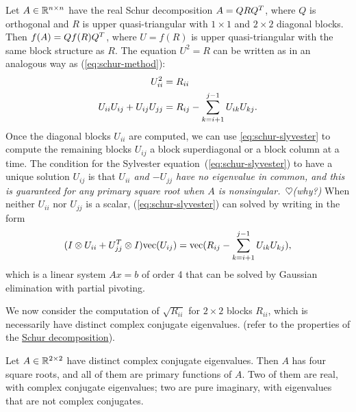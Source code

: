 \documentclass{article}
\newcommand{\textus}[1]{\textup{\textsf{#1}}}
\renewcommand{\comment}[1]{\textus{\color{violet}\ $\heartsuit$(#1)}}
\begin{document}
Let $A \in \mathbb{R}^{n\times n}$ have the real Schur decomposition $A = QRQ^{T}$, where $Q$
is orthogonal and $R$ is upper quasi-triangular with $1\times 1$ and
$2\times 2$ diagonal blocks. Then $f(A) = Qf(R)Q^{T}$, where $U = f(R)$ is
upper quasi-triangular with the same block structure as $R$. The equation
$U^2 = R$ can be written as in an analogous way as (\ref{eq:schur-method}):
\begin{align}
  U_{ii}^2 &= R_{ii} \notag \\ 
  U_{ii}U_{ij} + U_{ij}U_{jj} & = R_{ij} -
                                \sum_{k=i+1}^{j-1}U_{ik}U_{kj}. \label{eq:schur-slyvester} 
\end{align}
Once the diagonal blocks $U_{ii}$ are computed, we can use
\eqref{eq:schur-slyvester} to compute the remaining blocks $U_{ij}$ a block
superdiagonal or a block column at a time. The condition for the Sylvester
equation~(\ref{eq:schur-slyvester}) to have a unique solution $U_{ij}$ is
that \emph{$U_{ii}$ and $-U_{jj}$ have no eigenvalue in common, and this is
  guaranteed for any primary square root when $A$ is
  nonsingular.\comment{why?}} When neither $U_{ii}$ nor $U_{jj}$ is a
scalar, (\ref{eq:schur-slyvester}) can solved by writing in the form
\begin{equation}\notag
  (I \otimes U_{ii} + U_{jj}^{T} \otimes I) \mathrm{vec}(U_{ij}) =
  \mathrm{vec}(R_{ij} - \sum_{k=i+1}^{j-1}U_{ik}U_{kj}),
\end{equation}
which is a linear system $Ax = b$ of order 4 that can be solved by Gaussian
elimination with partial pivoting.

We now consider the computation of $\sqrt{R_{ii}}$ for $2\times 2$ blocks
$R_{ii}$, which is necessarily have distinct complex conjugate eigenvalues.
(refer to the properties of the
\href{https://nhigham.com/2022/05/11/what-is-a-schur-decomposition/}{Schur
  decomposition}).

\begin{lemma}\label{lemma:2by2-primary-sqrt}
  Let $A\in\mathbb{R}^{2\times 2}$ have distinct complex conjugate eigenvalues.
  Then $A$ has four square roots, and all of them are primary functions of
  $A$. Two of them are real, with complex conjugate eigenvalues; two are
  pure imaginary, with eigenvalues that are not complex conjugates.
\end{lemma}
\end{document}
